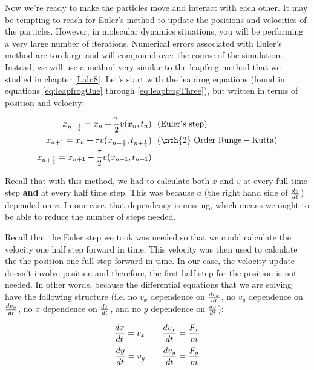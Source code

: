 Now we're ready to make the particles move and interact with each
other.  It may be tempting to reach for Euler's method to update the
positions and velocities of the particles.  However, in molecular
dynamics situations, you will be performing a very large number of
iterations. Numerical errors associated with Euler's method are too
large and will compound over the course of the simulation.  Instead, we
will use a method very similar to the leapfrog method that we studied
in chapter \ref{Lab:8}.   Let's start with the leapfrog equations
(found in equations \eqref{eq:leapfrogOne} through
\eqref{eq:leapfrogThree}), but written in terms of position and
velocity:

\begin{align}
x_{n + {1\over 2}} = x_n + {\tau\over 2} v(x_n,t_n)& ~~\mathrm{(Euler's~ step)}\\
x_{n + 1} = x_n + \tau v(x_{n + {1\over 2}},t_{n + {1\over 2}}) &
~~\mathrm{(\nth{2} ~Order~ Runge-Kutta)}\\
x_{n + {3\over 2}} = x_{n+1} + {\tau \over 2}v(x_{n+1},t_{n+1})&
\end{align}

Recall that with this method, we had to calculate both $x$ and $v$ at every full
time step \textbf{and} at every half time step.  This was because $a$
(the right hand side of ${dv \over dt}$) depended on $v$.  In our
case, that dependency is missing, which means we ought to be able to
reduce the number of steps needed. 

Recall that the Euler step we took was needed so that we could
calculate the velocity one half step forward in time.  This velocity
was then used to calculate the the position one full step forward in
time.  In our case, the velocity update doesn't involve position and
therefore, the first half step for the position is not needed.  In
other words, because the differential equations that we are solving
have the following structure (i.e. no $v_x$ dependence on ${dv_x\over
dt}$, no $v_y$ dependence on ${dv_y\over dt}$, no $x$ dependence on
${dx \over dt}$, and no $y$ dependence on ${dy \over dt}$):

\begin{equation}
{d x \over dt} = v_x \mathrm{~~~~~~} {{d v_x \over dt} = {F_x \over m}}
\end{equation}
\begin{equation}
{d y \over dt} = v_y \mathrm{~~~~~~} {{d v_y \over dt} = {F_y \over m}}
\end{equation}

